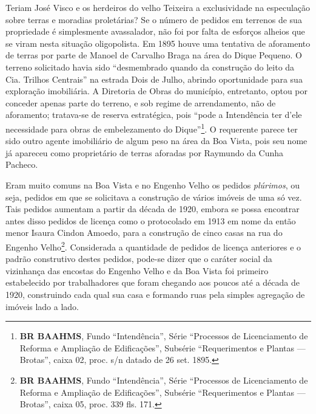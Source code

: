 Teriam José Visco e os herdeiros do velho Teixeira a exclusividade na especulação sobre terras e moradias proletárias? Se o número de pedidos em terrenos de sua propriedade é simplesmente avassalador, não foi por falta de esforços alheios que se viram nesta situação oligopolista. Em 1895 houve uma tentativa de aforamento de terras por parte de Manoel de Carvalho Braga na área do Dique Pequeno. O terreno solicitado havia sido ``desmembrado quando da construção do leito da Cia. Trilhos Centrais'' na estrada Dois de Julho, abrindo oportunidade para sua exploração imobiliária. A Diretoria de Obras do município, entretanto, optou por conceder apenas parte do terreno, e sob regime de arrendamento, não de aforamento; tratava-se de reserva estratégica, pois ``pode a Intendência ter d'ele necessidade para obras de embelezamento do Dique''\footnote{\textbf{BR BAAHMS}, Fundo ``Intendência'', Série ``Processos de Licenciamento de Reforma e Ampliação de Edificações'', Subsérie ``Requerimentos e Plantas --- Brotas'', caixa 02, proc. s/n datado de 26 set. 1895.}. O requerente parece ter sido outro agente imobiliário de algum peso na área da Boa Vista, pois seu nome já apareceu como proprietário de terras aforadas por Raymundo da Cunha Pacheco.


Eram muito comuns na Boa Vista e no Engenho Velho os pedidos \textit{plúrimos}, ou seja, pedidos em que se solicitava a construção de vários imóveis de uma só vez. Tais pedidos aumentam a partir da década de 1920, embora se possa encontrar antes disso pedidos de licença como o protocolado em 1913 em nome da então menor Isaura Cindon Amoedo, para a construção de cinco casas na rua do Engenho Velho\footnote{\textbf{BR BAAHMS}, Fundo ``Intendência'', Série ``Processos de Licenciamento de Reforma e Ampliação de Edificações'', Subsérie ``Requerimentos e Plantas --- Brotas'', caixa 05, proc. 339 fls. 171.}. Considerada a quantidade de pedidos de licença anteriores e o padrão construtivo destes pedidos, pode-se dizer que o caráter social da vizinhança das encostas do Engenho Velho e da Boa Vista foi primeiro estabelecido por trabalhadores que foram chegando aos poucos até a década de 1920, construindo cada qual sua casa e formando ruas pela simples agregação de imóveis lado a lado. 

